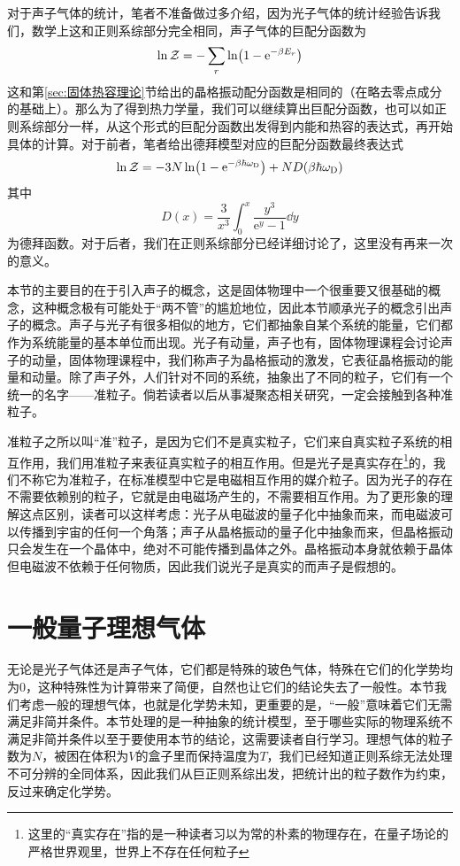\documentclass[../../main.tex]{subfiles}
\begin{document}
对于声子气体的统计，笔者不准备做过多介绍，因为光子气体的统计经验告诉我们，数学上这和正则系综部分完全相同，声子气体的巨配分函数为
\begin{equation}
    \ln\mathcal{Z}=-\sum_r \ln(1-\mathrm{e}^{-\beta E_r})
\end{equation}
这和第\ref{sec:固体热容理论}节给出的晶格振动配分函数是相同的（在略去零点成分的基础上）。那么为了得到热力学量，我们可以继续算出巨配分函数，也可以如正则系综部分一样，从这个形式的巨配分函数出发得到内能和热容的表达式，再开始具体的计算。对于前者，笔者给出德拜模型对应的巨配分函数最终表达式
\begin{equation}
    \ln\mathcal{Z}=-3N\ln(1-\mathrm{e}^{-\beta \hbar\omega_{\mathrm{D}}})+ND(\beta\hbar\omega_{\mathrm{D}})
\end{equation}
其中
\begin{equation}
    D(x)=\frac{3}{x^3}\int_0^{x}\frac{y^3}{\mathrm{e}^y-1}\dd y
\end{equation}
为德拜函数。对于后者，我们在正则系综部分已经详细讨论了，这里没有再来一次的意义。

本节的主要目的在于引入声子的概念，这是固体物理中一个很重要又很基础的概念，这种概念极有可能处于“两不管”的尴尬地位，因此本节顺承光子的概念引出声子的概念。声子与光子有很多相似的地方，它们都抽象自某个系统的能量，它们都作为系统能量的基本单位而出现。光子有动量，声子也有，固体物理课程会讨论声子的动量，固体物理课程中，我们称声子为晶格振动的激发，它表征晶格振动的能量和动量。除了声子外，人们针对不同的系统，抽象出了不同的粒子，它们有一个统一的名字——准粒子。倘若读者以后从事凝聚态相关研究，一定会接触到各种准粒子。

准粒子之所以叫“准”粒子，是因为它们不是真实粒子，它们来自真实粒子系统的相互作用，我们用准粒子来表征真实粒子的相互作用。但是光子是真实存在\footnote{这里的“真实存在”指的是一种读者习以为常的朴素的物理存在，在量子场论的严格世界观里，世界上不存在任何粒子}的，我们不称它为准粒子，在标准模型中它是电磁相互作用的媒介粒子。因为光子的存在不需要依赖别的粒子，它就是由电磁场产生的，不需要相互作用。为了更形象的理解这点区别，读者可以这样考虑：光子从电磁波的量子化中抽象而来，而电磁波可以传播到宇宙的任何一个角落；声子从晶格振动的量子化中抽象而来，但晶格振动只会发生在一个晶体中，绝对不可能传播到晶体之外。晶格振动本身就依赖于晶体但电磁波不依赖于任何物质，因此我们说光子是真实的而声子是假想的。

\section{一般量子理想气体}

无论是光子气体还是声子气体，它们都是特殊的玻色气体，特殊在它们的化学势均为0，这种特殊性为计算带来了简便，自然也让它们的结论失去了一般性。本节我们考虑一般的理想气体，也就是化学势未知，更重要的是，“一般”意味着它们无需满足非简并条件。本节处理的是一种抽象的统计模型，至于哪些实际的物理系统不满足非简并条件以至于要使用本节的结论，这需要读者自行学习。理想气体的粒子数为\(N\)，被困在体积为\(V\)的盒子里而保持温度为\(T\)，我们已经知道正则系综无法处理不可分辨的全同体系，因此我们从巨正则系综出发，把统计出的粒子数作为约束，反过来确定化学势。
\end{document}
